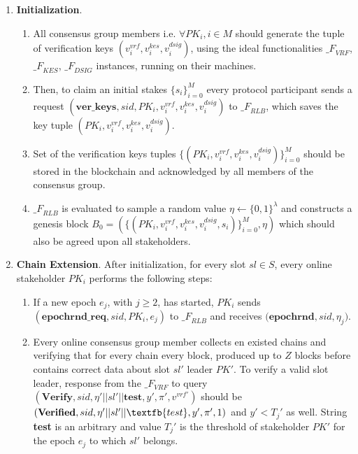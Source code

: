 \begin{enumerate}
    \item \textbf{Initialization}.
    \begin{enumerate}
        \item All consensus group members i.e. $\forall PK_i, i \in M$ should generate the tuple of verification keys ${(v_i^{vrf}, v_i^{kes}, v_i^{dsig})}$, using the ideal functionalities ${\mathcal_{F}}_{VRF}$, ${\mathcal_{F}}_{KES}$, ${\mathcal_{F}}_{DSIG}$ instances, running on their machines.
        \item Then, to claim an initial stakes $\{s_i\}_{i=0}^M$ every protocol participant sends a request ${(\textbf{ver\_keys}, sid, PK_i, v_i^{vrf}, v_i^{kes}, v_i^{dsig})}$ to ${\mathcal_{F}}_{RLB}$, which saves the key tuple ${(PK_i, v_i^{vrf}, v_i^{kes}, v_i^{dsig})}$.
        \item Set of the verification keys tuples ${\{(PK_i, v_i^{vrf}, v_i^{kes}, v_i^{dsig})\}_{i=0}^M}$ should be stored in the blockchain and acknowledged by all members of the consensus group.
        \item ${\mathcal_{F}}_{RLB}$ is evaluated to sample a random value $\eta \leftarrow \{0, 1\}^\lambda$ and constructs a genesis block ${B_0=\left(\{(PK_i, v_i^{vrf}, v_i^{kes}, v_i^{dsig}, s_i)\}_{i=0}^M, \eta\right)}$ which should also be agreed upon all stakeholders.
    \end{enumerate}
    \item \textbf{Chain Extension}.
    After initialization, for every slot $sl \in S$, every online stakeholder $PK_i$ performs the following steps:
    \begin{enumerate}
        \item If a new epoch $e_j$, with $j \geqslant 2$, has started, $PK_i$ sends ${(\textbf{epochrnd\_req}, sid, PK_i, e_j)}$ to ${\mathcal_{F}}_{RLB}$ and receives $({\textbf{epochrnd}, sid, \eta_j)}$.
        \item Every online consensus group member collects en existed chains and verifying that for every chain every block, produced up to $Z$ blocks before contains correct data about slot $sl'$ leader $PK'$.
        To verify a valid slot leader, response from the ${\mathcal_{F}}_{VRF}$ to query ${(\textbf{Verify}, sid, \eta' || sl' || \textbf{test}, y', \pi', v^{vrf'})}$ should be ${(\textbf{Verified}, sid, \eta' || sl' || \textfb{test}, y', \pi', 1)}$ and $y'<T_j'$ as well.
        String \textbf{test} is an arbitrary and value $T_j'$ is the threshold of stakeholder $PK'$ for the epoch $e_j$ to which $sl'$ belongs.


\end{enumerate}
\end{enumerate}
